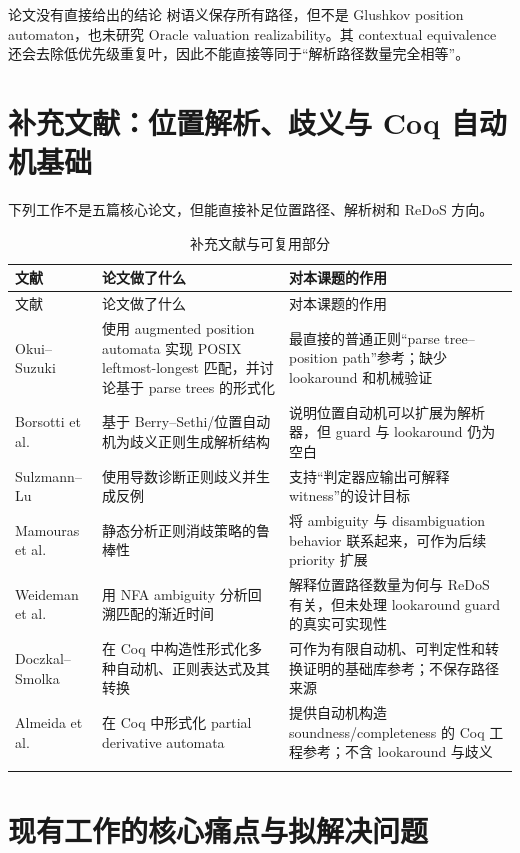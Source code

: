 \documentclass[UTF8,a4paper,12pt]{ctexart}
\begin{document}
\begin{boundarybox}{论文没有直接给出的结论}
树语义保存所有路径，但不是 Glushkov position automaton，也未研究 Oracle valuation realizability。其 contextual equivalence 还会去除低优先级重复叶，因此不能直接等同于“解析路径数量完全相等”。
\end{boundarybox}

\section{补充文献：位置解析、歧义与 Coq 自动机基础}

下列工作不是五篇核心论文，但能直接补足位置路径、解析树和 ReDoS 方向。

\begin{longtable}{p{3.3cm}p{5.3cm}p{5.8cm}}
\toprule
文献 & 论文做了什么 & 对本课题的作用 \\
\midrule
\endfirsthead
\toprule
文献 & 论文做了什么 & 对本课题的作用 \\
\midrule
\endhead
Okui--Suzuki \cite{okui2011} & 使用 augmented position automata 实现 POSIX leftmost-longest 匹配，并讨论基于 parse trees 的形式化 & 最直接的普通正则“parse tree--position path”参考；缺少 lookaround 和机械验证 \\
Borsotti et al. \cite{borsotti2021} & 基于 Berry--Sethi/位置自动机为歧义正则生成解析结构 & 说明位置自动机可以扩展为解析器，但 guard 与 lookaround 仍为空白 \\
Sulzmann--Lu \cite{sulzmann2017} & 使用导数诊断正则歧义并生成反例 & 支持“判定器应输出可解释 witness”的设计目标 \\
Mamouras et al. \cite{mamouras2024static} & 静态分析正则消歧策略的鲁棒性 & 将 ambiguity 与 disambiguation behavior 联系起来，可作为后续 priority 扩展 \\
Weideman et al. \cite{weideman2016} & 用 NFA ambiguity 分析回溯匹配的渐近时间 & 解释位置路径数量为何与 ReDoS 有关，但未处理 lookaround guard 的真实可实现性 \\
Doczkal--Smolka \cite{doczkal2018} & 在 Coq 中构造性形式化多种自动机、正则表达式及其转换 & 可作为有限自动机、可判定性和转换证明的基础库参考；不保存路径来源 \\
Almeida et al. \cite{almeida2011} & 在 Coq 中形式化 partial derivative automata & 提供自动机构造 soundness/completeness 的 Coq 工程参考；不含 lookaround 与歧义 \\
\bottomrule
\caption{补充文献与可复用部分}
\end{longtable}

\section{现有工作的核心痛点与拟解决问题}
\end{document}
